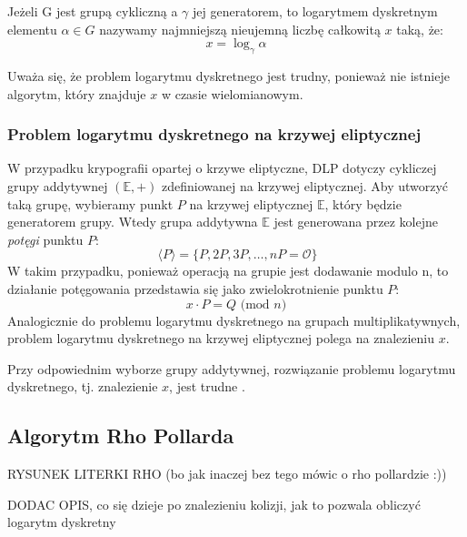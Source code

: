 Jeżeli G jest grupą cykliczną a $\gamma$ jej generatorem, to logarytmem dyskretnym
elementu $\alpha \in G$ nazywamy najmniejszą nieujemną liczbę całkowitą $x$ taką, że:
\[x = \log_{\gamma}{\alpha}\]

Uważa się, że problem logarytmu dyskretnego jest trudny, ponieważ nie istnieje
algorytm, który znajduje $x$ w czasie wielomianowym\cite{Stinson2021}.


\subsubsection{Problem logarytmu dyskretnego na krzywej eliptycznej}
W przypadku krypografii opartej o krzywe eliptyczne, DLP dotyczy cykliczej
grupy addytywnej $(\mathbb{E},+)$ zdefiniowanej na krzywej eliptycznej.
Aby utworzyć taką grupę, wybieramy punkt $P$ na krzywej eliptycznej $\mathbb{E}$,
który będzie generatorem grupy. Wtedy grupa addytywna $\mathbb{E}$ jest generowana przez
kolejne \textit{potęgi} punktu $P$:
\[\ \langle P \rangle = \{P, 2P, 3P, \ldots, nP = \mathcal{O}\}\]
W takim przypadku, ponieważ operacją na grupie jest dodawanie modulo n, to działanie
potęgowania przedstawia się jako zwielokrotnienie punktu $P$:
\[x \cdot P = Q \textrm{ (mod } n)\]
Analogicznie do problemu logarytmu dyskretnego na grupach multiplikatywnych,
problem logarytmu dyskretnego na krzywej eliptycznej polega na znalezieniu
$x$.
\par
Przy odpowiednim wyborze grupy addytywnej, rozwiązanie problemu logarytmu dyskretnego,
tj. znalezienie $x$,
jest trudne \cite{Stinson2021}.


\subsection{Algorytm Rho Pollarda}
 
RYSUNEK LITERKI RHO (bo jak inaczej bez tego mówic o rho pollardzie :))

DODAC OPIS, co się dzieje po znalezieniu kolizji, jak to pozwala obliczyć logarytm dyskretny

